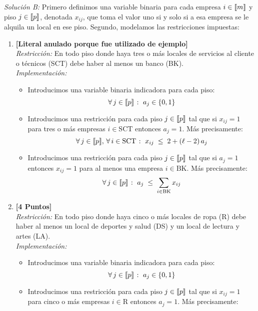 \documentclass[ a4paper, twoside, 11pt]{article}
\begin{document}
\begin{problem}
\begin{enumerate}[label=\textbf{\alph*)}]
\end{enumerate}

\emph{Soluci\'on B:} Primero definimos una variable binaria para cada empresa $i \in \llbracket m \rrbracket$ y piso $j \in \llbracket p \rrbracket$, denotada $x_{ij}$, que toma el valor uno si y solo si a esa empresa se le alquila un local en ese piso. Segundo, modelamos las restricciones impuestas: 
\begin{enumerate}[label=\textbf{\alph*)}]
\item \textbf{[Literal anulado porque fue utilizado de ejemplo]} \\[1ex]
\emph{Restricci\'on:} En todo piso donde haya tres o m\'as locales de servicios al cliente o t\'ecnicos (SCT) debe haber al menos un banco (BK). \\[1ex]
\emph{Implementaci\'on:}
\begin{itemize}
\item Introducimos una variable binaria indicadora para cada piso: 
\[
\forall \, j \in \llbracket p \rrbracket \; \colon \; a_j \in \{ 0, 1 \}
\]
\item Introducimos una restricci\'on para cada piso $j \in \llbracket p \rrbracket$ tal que si $x_{ij} = 1$ para tres o m\'as empresas $i \in \text{SCT}$ entonces $a_j = 1$. M\'as precisamente: 
\[
\forall \, j \in \llbracket p \rrbracket, \, \forall \, i \in \text{SCT} \; \colon \;
x_{ij} \; \leq \; 2 + (\ell - 2) \, a_j
\]
\item Introducimos una restricci\'on para cada piso $j \in \llbracket p \rrbracket$ tal que si $a_j = 1$ entonces $x_{ij} = 1$ para al menos una empresa $i \in \text{BK}$. M\'as precisamente: 
\[
\forall \, j \in \llbracket p \rrbracket \; \colon \;
a_j \; \leq \; \sum_{i \in \text{BK}} x_{ij}
\]
\end{itemize}
\item \textbf{[4 Puntos]} \\[1ex]
\emph{Restricci\'on:} En todo piso donde haya cinco o m\'as locales de ropa (R) debe haber al menos un local de deportes y salud (DS) y un local de lectura y artes (LA). \\[1ex]
\emph{Implementaci\'on:}
\begin{itemize}
\item Introducimos una variable binaria indicadora para cada piso: 
\[
\forall \, j \in \llbracket p \rrbracket \; \colon \; a_j \in \{ 0, 1 \}
\]
\item Introducimos una restricci\'on para cada piso $j \in \llbracket p \rrbracket$ tal que si $x_{ij} = 1$ para cinco o m\'as empresas $i \in \text{R}$ entonces $a_j = 1$. M\'as precisamente: 

\end{itemize}
\end{enumerate}
\end{problem}
\end{document}
